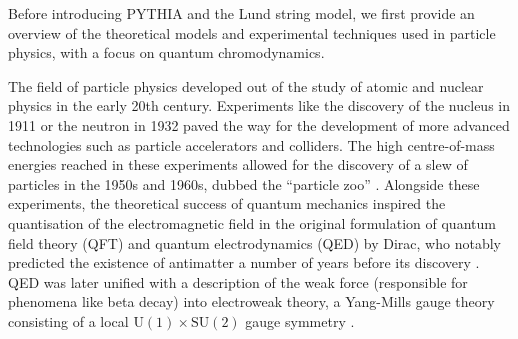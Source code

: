 \documentclass[12pt,a4paper]{report}
\begin{document}
Before introducing PYTHIA and the Lund string model, we first provide an overview of the theoretical models and experimental techniques used in particle physics, with a focus on quantum chromodynamics.

The field of particle physics developed out of the study of atomic and nuclear physics in the early 20th century. Experiments like the discovery of the nucleus in 1911 \cite{rutherford_scattering_1911} or the neutron in 1932 \cite{chadwick_existence_1932} paved the way for the development of more advanced technologies such as particle accelerators and colliders. The high centre-of-mass energies reached in these experiments allowed for the discovery of a slew of particles in the 1950s and 1960s, dubbed the ``particle zoo'' \cite{gross_50_2023}. Alongside these experiments, the theoretical success of quantum mechanics inspired the quantisation of the electromagnetic field in the original formulation of quantum field theory (QFT) and quantum electrodynamics (QED) by Dirac, who notably predicted the existence of antimatter a number of years before its discovery \cite{dirac_quantum_1928,anderson_apparent_1932}. QED was later unified with a description of the weak force (responsible for phenomena like beta decay) into electroweak theory, a Yang-Mills gauge theory consisting of a local $\text{U}(1) \times \text{SU}(2)$ gauge symmetry \cite{navas_review_2024,thomson_modern_2013}.
\end{document}
